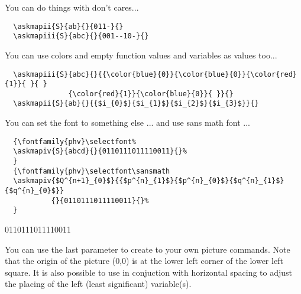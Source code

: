 \documentclass[a4paper,10pt]{ltxdoc}
\begin{document}
\bigskip\bigskip


You can do things with don't cares...
\begin{verbatim}
  \askmapii{S}{ab}{}{011-}{}
  \askmapiii{S}{abc}{}{001--10-}{}
\end{verbatim}
\bigskip\bigskip

You can use colors and empty function values and variables as values too...
\begin{verbatim}
  \askmapiii{S}{abc}{}{{\color{blue}{0}}{\color{blue}{0}}{\color{red}{1}}{ }{ }
               {\color{red}{1}}{\color{blue}{0}}{ }}{}
  \askmapii{S}{ab}{}{{$i_{0}$}{$i_{1}$}{$i_{2}$}{$i_{3}$}}{}
\end{verbatim}
\bigskip


You can set the font to something else ... and use sans math font ...
\begin{verbatim}
  {\fontfamily{phv}\selectfont%
  \askmapiv{S}{abcd}{}{0110111011110011}{}%
  }
  {\fontfamily{phv}\selectfont\sansmath
  \askmapiv{$Q^{n+1}_{0}$}{{$p^{n}_{1}$}{$p^{n}_{0}$}{$q^{n}_{1}$}{$q^{n}_{0}$}}
           {}{0110111011110011}{}%
  }
\end{verbatim}
{\selectfont%
%
}
{\selectfont\sansmath
{}
         {}{0110111011110011}{}%
}
\bigskip\bigskip

You can use the last parameter to create to your own picture commands. Note
that the origin of the picture (0,0) is at the lower left corner of the lower
left square. It is also possible to use  in conjuction with
horizontal spacing to adjust the placing of the left (least significant)
variable(s).
\end{document}
